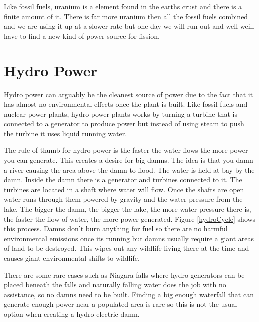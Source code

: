 \documentclass[msc,oneside]{ubcthesis}%
\begin{document}
Like fossil fuels, uranium is a element found in the earths crust and there is a finite amount of it. There 
is far more uranium then all the fossil fuels combined and we are using it up at a slower rate but one day 
we will run out and well weill have to find a new kind of power source for fission. 

\newpage
\section{Hydro Power}

Hydro power can arguably be the cleanest source of power due to the fact that it has almost no 
environmental effects once the plant is built. Like fossil fuels and nuclear power plants, hydro power 
plants works by turning a turbine that is connected to a generator to produce power but instead of using 
steam to push the turbine it uses liquid running water.

The rule of thumb for hydro power is the faster the water flows the more power you can generate. This 
creates a desire for big damns. The idea is that you damn a river causing the area above the damn 
to flood. The water is held at bay by the damn. Inside the damn there is a generator and turbines connected 
to it. The turbines are located in a shaft where water will flow. Once the shafts are open water runs 
through them powered by gravity and the water pressure from the lake. The bigger the damn, the bigger the 
lake, the more water pressure there is, the faster the flow of water, the more power generated. 
Figure \ref{hydroCycle} shows this process. Damns don't burn 
anything for fuel so there are no harmful environmental emissions once its running but damns usually 
require a giant areas of land to be destroyed. This wipes out any wildlife living there at the time and 
causes giant environmental shifts to wildlife. 

There are some rare cases such as Niagara falls where hydro generators can be placed beneath the falls and 
naturally falling water does the job with no assistance, so no damns need to be built. Finding a big enough 
waterfall that can generate enough power near a populated area is rare so this is not the usual option when 
creating a hydro electric damn. 
\end{document}
